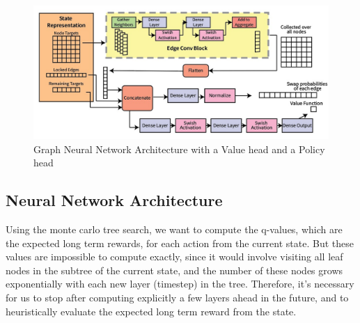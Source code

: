 \documentclass[%
 reprint,
 amsmath,amssymb,
 aps,
]{revtex4-2}
\begin{document}
\begin{figure}[tp]
    \includegraphics[width=\textwidth]{images/network-architecture.jpg}
    \caption{\label{fig:network-architecture}
        Graph Neural Network Architecture with a Value head and a Policy head}
\end{figure}

\subsection{\label{sec:method-model}Neural Network Architecture}

Using the monte carlo tree search, we want to compute the q-values, which are the expected long term rewards, for each action from the current state. But these values are impossible to compute exactly, since it would involve visiting all leaf nodes in the subtree of the current state, and the number of these nodes grows exponentially with each new layer (timestep) in the tree. Therefore, it's necessary for us to stop after computing explicitly a few layers ahead in the future, and to heuristically evaluate the expected long term reward from the state.
\end{document}
